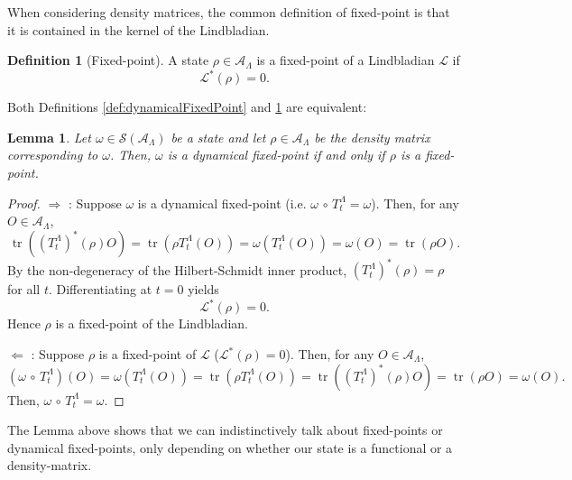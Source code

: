 \documentclass[11pt]{article}
\numberwithin{equation}{section}
\numberwithin{figure}{section}
\numberwithin{table}{section}
\theoremstyle{definition}
\newtheorem{mydef}{Definition}[section]
\theoremstyle{plain}
\newtheorem{lem}[thm]{Lemma}
\theoremstyle{remark}
\newcommand{\w}{\omega}
\newcommand{\Li}{\mathcal{L}}
\newcommand{\A}{\mathcal{A}}
\newcommand{\La}{\Lambda}
\newcommand{\T}{T^\Lambda}
\newcommand{\tr}{\operatorname{tr}}
\begin{document}
When considering density matrices, the common definition of fixed-point is that it is contained in the kernel of the Lindbladian. 
\medskip
\begin{mydef}[Fixed-point]\label{def:fixed-point}
    A state $\rho\in\A_\La$ is a fixed-point of a Lindbladian $\Li$ if
    \begin{equation}
        \Li^*(\rho)=0.
    \end{equation}
\end{mydef}

Both Definitions \ref{def:dynamicalFixedPoint} and \ref{def:fixed-point} are equivalent:
\medskip
\begin{lem}
    Let $\w\in\mathcal{S}(\A_\La)$ be a state and let $\rho\in\A_\La$ be the density matrix corresponding to $\w$. Then, $\w$ is a dynamical fixed-point if and only if $\rho$ is a fixed-point.
\end{lem}
\begin{proof}
    $\Rightarrow$ : Suppose $\w$ is a dynamical fixed-point (i.e. $\w\,\circ \, \T_t=\w$). Then, for any $O\in\A_\La$,
    \begin{equation}
        \tr((\T_t)^*(\rho)O)=\tr( \rho \T_t(O))=\w(\T_t(O))=\w(O)=\tr(\rho O).
    \end{equation}
    By the non-degeneracy of the Hilbert-Schmidt inner product, $(\T_t)^*(\rho)=\rho$ for all $t$. Differentiating at $t=0$ yields
    \begin{equation}
        \Li^*(\rho)=0.
    \end{equation}
    Hence $\rho$ is a fixed-point of the Lindbladian.

    $\Leftarrow$ : Suppose $\rho$ is a fixed-point of $\Li$ ($\Li^*(\rho)=0$). Then, for any $O\in\A_\La$,
    \begin{equation}
        (\w\,\circ\,\T_t)(O)=\w(\T_t(O))=\tr(\rho \T_t(O))=\tr((\T_t)^*(\rho)O)=\tr(\rho O)=\w(O).
    \end{equation}
    Then, $\w\,\circ\,\T_t=\w$.
\end{proof}
The Lemma above shows that we can indistinctively  talk about fixed-points or dynamical fixed-points, only depending on whether our state is a functional or a density-matrix. 
\end{document}
